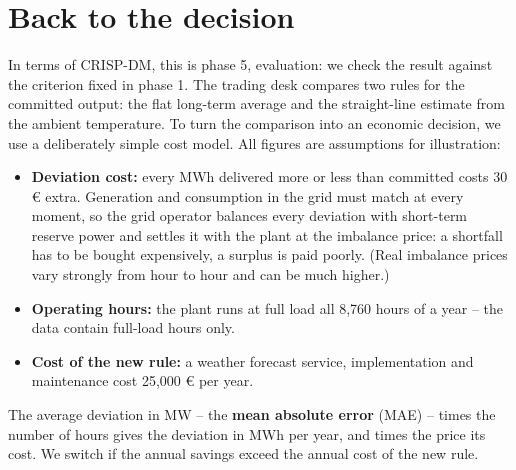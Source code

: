 \documentclass[
  letterpaper,
  DIV=11,
  numbers=noendperiod]{scrreprt}
\providecommand{\tightlist}{%
  \setlength{\itemsep}{0pt}\setlength{\parskip}{0pt}}\usepackage{longtable,booktabs,array}
\begin{document}
\section{Back to the decision}\label{back-to-the-decision}

In terms of CRISP-DM, this is phase 5, evaluation: we check the result
against the criterion fixed in phase 1. The trading desk compares two
rules for the committed output: the flat long-term average and the
straight-line estimate from the ambient temperature. To turn the
comparison into an economic decision, we use a deliberately simple cost
model. All figures are assumptions for illustration:

\begin{itemize}
\tightlist
\item
  \textbf{Deviation cost:} every MWh delivered more or less than
  committed costs 30 € extra. Generation and consumption in the grid
  must match at every moment, so the grid operator balances every
  deviation with short-term reserve power and settles it with the plant
  at the imbalance price: a shortfall has to be bought expensively, a
  surplus is paid poorly. (Real imbalance prices vary strongly from hour
  to hour and can be much higher.)
\item
  \textbf{Operating hours:} the plant runs at full load all 8,760 hours
  of a year -- the data contain full-load hours only.
\item
  \textbf{Cost of the new rule:} a weather forecast service,
  implementation and maintenance cost 25,000 € per year.
\end{itemize}

The average deviation in MW -- the \textbf{mean absolute error} (MAE) --
times the number of hours gives the deviation in MWh per year, and times
the price its cost. We switch if the annual savings exceed the annual
cost of the new rule.
\end{document}

